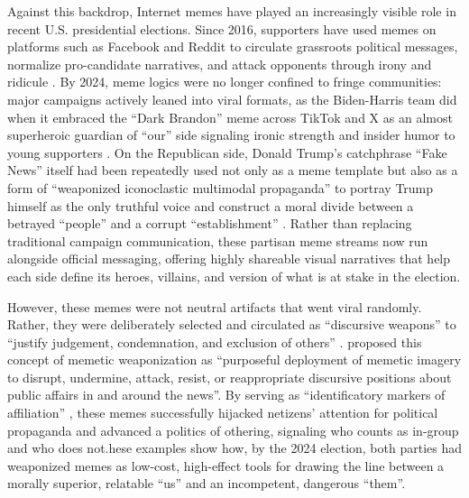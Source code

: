 \documentclass[12pt,twoside]{article}
\begin{document}
Against this backdrop, Internet memes have played an increasingly visible role in recent U.S. presidential elections. Since 2016, supporters have used memes on platforms such as Facebook and Reddit to circulate grassroots political messages, normalize pro-candidate narratives, and attack opponents through irony and ridicule \parencite{hunting2020popularmediamemes, moodyramirez2019facebookmemegroups}. By 2024, meme logics were no longer confined to fringe communities: major campaigns actively leaned into viral formats, as the Biden-Harris team did when it embraced the ``Dark Brandon'' meme across TikTok and X as an almost superheroic guardian of ``our'' side\added{,} signaling ironic strength and insider humor to young supporters \parencite{robertson2024bidenmemelord,mielczarek2024darkbrandonenthymeme}. On the Republican side, Donald Trump's catchphrase ``Fake News'' itself had been repeatedly used not only as a meme template but also as a form of ``weaponized iconoclastic multimodal propaganda'' \parencite[303]{smith2019weaponizediconoclasm} to portray Trump himself as the only truthful voice and construct a moral divide between a betrayed ``people'' and a corrupt ``establishment'' \parencite{ross2018discursivedeflection,woodward2020fakenewsguide}. Rather than replacing traditional campaign communication, these partisan meme streams now run alongside official messaging, offering highly shareable visual narratives that help each side define its heroes, villains, and version of what is at stake in the election.

However, these memes were not neutral artifacts that went viral randomly. Rather, they were deliberately selected and circulated as ``discursive weapons'' to ``justify judgement, condemnation, and exclusion of others'' \parencite[495]{nissenbaum2017contestedculturalcapital}. \textcite[218-219]{peters2021weaponizingmemes} proposed this concept of memetic weaponization as ``purposeful deployment of memetic imagery to disrupt, undermine, attack, resist, or reappropriate discursive positions about public affairs in and around the news''. By serving as ``identificatory markers of affiliation'' \parencite[219]{peters2021weaponizingmemes}, these memes successfully hijacked netizens' attention for political propaganda \parencite{olsen2018weaponizedmemes} and advanced a politics of othering, signaling who counts as in-group and who does not.hese examples show how, by the 2024 election, both parties had weaponized memes as low-cost, high-effect tools for drawing the line between a morally superior, relatable ``us'' and an incompetent, dangerous ``them''. 
\end{document}

